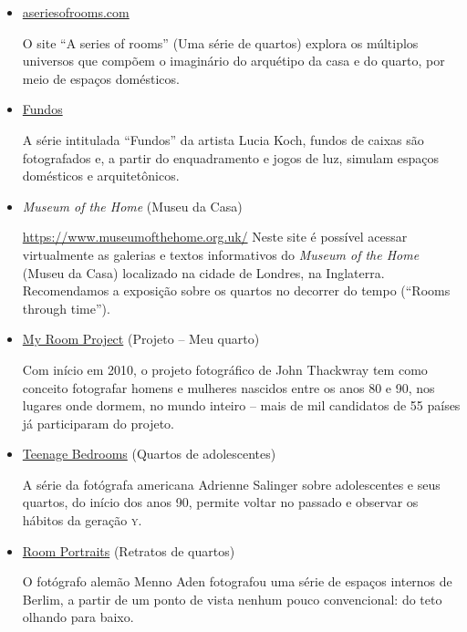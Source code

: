 \documentclass[12pt]{extarticle}
\begin{document}
\begin{itemize}

\item \href{https://aseriesofrooms.com/\#/}{aseriesofrooms.com}

O site ``A series of rooms'' (Uma série de quartos) explora os 
múltiplos universos que compõem o imaginário do arquétipo da 
casa e do quarto, por meio de espaços domésticos.

\item \href{http://www.luciakoch.com/trabalhos/fundos/index_pt.htm}{Fundos}

A série intitulada ``Fundos'' da artista Lucia Koch, fundos de 
caixas são fotografados e, a partir do enquadramento e jogos de luz, 
simulam espaços domésticos e arquitetônicos.

\item \emph{Museum of the Home} (Museu da Casa)
		
\url{https://www.museumofthehome.org.uk/}
Neste site é possível acessar virtualmente as galerias e textos 
informativos do \emph{Museum of the Home} (Museu da Casa) localizado 
na cidade de Londres, na Inglaterra. Recomendamos a exposição
sobre os quartos no decorrer do tempo (``Rooms through time'').

\item \href{http://myroomphotos.com/the-project/}{My Room Project} (Projeto -- Meu quarto)

Com início em 2010, o projeto fotográfico de John Thackwray tem 
como conceito fotografar homens e mulheres nascidos entre os anos 
80 e 90, nos lugares onde dormem, no mundo inteiro -- mais de mil 
candidatos de 55 países já participaram do projeto. 

\item \href{https://www.itsnicethat.com/articles/adrienne-salinger-teenage-bedrooms-90s-120416}{Teenage Bedrooms} (Quartos de adolescentes)

A série da fotógrafa americana Adrienne Salinger sobre adolescentes 
e seus quartos, do início dos anos 90, permite voltar no passado e 
observar os hábitos da geração \textsc{y}.

\item \href{https://www.dezeen.com/2012/06/12/room-portraits-by-menno-aden/}{Room Portraits} (Retratos de quartos)

O fotógrafo alemão Menno Aden fotografou uma série de espaços internos 
de Berlim, a partir de um  ponto de vista nenhum pouco convencional: 
do teto olhando para baixo.
\end{itemize}
\end{document}
